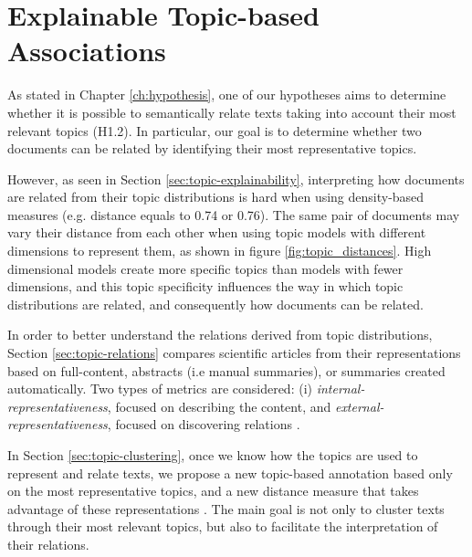 

\chapter{Explainable Topic-based Associations}\label{ch:explainability}

\graphicspath{{explainability/figures/}}


As stated in Chapter \ref{ch:hypothesis}, one of our hypotheses aims to determine whether it is possible to semantically relate texts taking into account their most relevant topics (H1.2). In particular, our goal is to determine whether two documents can be related by identifying their most representative topics.

However, as seen in Section \ref{sec:topic-explainability}, interpreting how documents are related from their topic distributions is hard when using density-based measures (e.g. distance equals to 0.74 or 0.76). The same pair of documents may vary their distance from each other when using topic models with different dimensions to represent them, as shown in figure \ref{fig:topic_distances}. High dimensional models create more specific topics than models with fewer dimensions, and this topic specificity influences the way in which topic distributions are related, and consequently how documents can be related. 

In order to better understand the relations derived from topic distributions, Section \ref{sec:topic-relations} compares scientific articles from their representations based on full-content, abstracts (i.e manual summaries), or summaries created automatically. Two types of metrics are considered: (i) \textit{internal-representativeness}, focused on describing the content, and \textit{external-representativeness}, focused on discovering relations \citep{Badenes-Olmedo2017c}.    

In Section \ref{sec:topic-clustering}, once we know how the topics are used to represent and relate texts, we propose a new topic-based annotation based only on the most representative topics, and a new distance measure that takes advantage of these representations \citep{Badenes-Olmedo2017b}. The main goal is not only to cluster texts through their most relevant topics, but also to facilitate the interpretation of their relations. 



